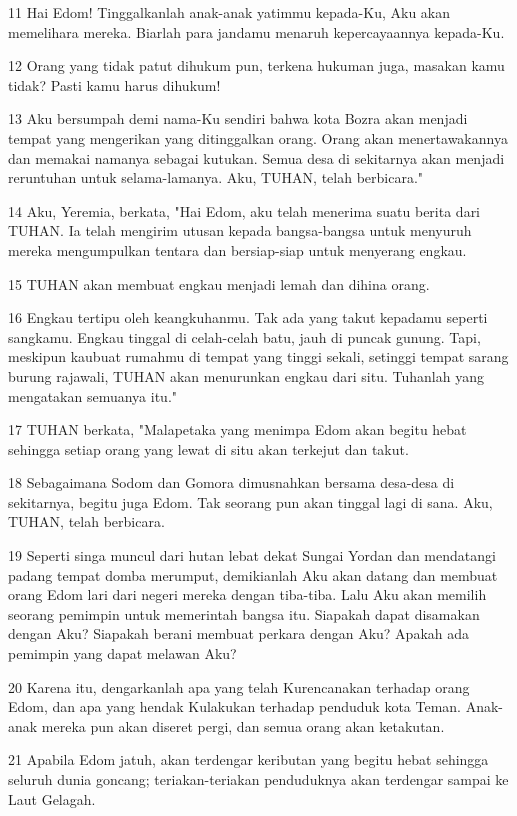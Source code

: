 \par 11 Hai Edom! Tinggalkanlah anak-anak yatimmu kepada-Ku, Aku akan memelihara mereka. Biarlah para jandamu menaruh kepercayaannya kepada-Ku.
\par 12 Orang yang tidak patut dihukum pun, terkena hukuman juga, masakan kamu tidak? Pasti kamu harus dihukum!
\par 13 Aku bersumpah demi nama-Ku sendiri bahwa kota Bozra akan menjadi tempat yang mengerikan yang ditinggalkan orang. Orang akan menertawakannya dan memakai namanya sebagai kutukan. Semua desa di sekitarnya akan menjadi reruntuhan untuk selama-lamanya. Aku, TUHAN, telah berbicara."
\par 14 Aku, Yeremia, berkata, "Hai Edom, aku telah menerima suatu berita dari TUHAN. Ia telah mengirim utusan kepada bangsa-bangsa untuk menyuruh mereka mengumpulkan tentara dan bersiap-siap untuk menyerang engkau.
\par 15 TUHAN akan membuat engkau menjadi lemah dan dihina orang.
\par 16 Engkau tertipu oleh keangkuhanmu. Tak ada yang takut kepadamu seperti sangkamu. Engkau tinggal di celah-celah batu, jauh di puncak gunung. Tapi, meskipun kaubuat rumahmu di tempat yang tinggi sekali, setinggi tempat sarang burung rajawali, TUHAN akan menurunkan engkau dari situ. Tuhanlah yang mengatakan semuanya itu."
\par 17 TUHAN berkata, "Malapetaka yang menimpa Edom akan begitu hebat sehingga setiap orang yang lewat di situ akan terkejut dan takut.
\par 18 Sebagaimana Sodom dan Gomora dimusnahkan bersama desa-desa di sekitarnya, begitu juga Edom. Tak seorang pun akan tinggal lagi di sana. Aku, TUHAN, telah berbicara.
\par 19 Seperti singa muncul dari hutan lebat dekat Sungai Yordan dan mendatangi padang tempat domba merumput, demikianlah Aku akan datang dan membuat orang Edom lari dari negeri mereka dengan tiba-tiba. Lalu Aku akan memilih seorang pemimpin untuk memerintah bangsa itu. Siapakah dapat disamakan dengan Aku? Siapakah berani membuat perkara dengan Aku? Apakah ada pemimpin yang dapat melawan Aku?
\par 20 Karena itu, dengarkanlah apa yang telah Kurencanakan terhadap orang Edom, dan apa yang hendak Kulakukan terhadap penduduk kota Teman. Anak-anak mereka pun akan diseret pergi, dan semua orang akan ketakutan.
\par 21 Apabila Edom jatuh, akan terdengar keributan yang begitu hebat sehingga seluruh dunia goncang; teriakan-teriakan penduduknya akan terdengar sampai ke Laut Gelagah.
